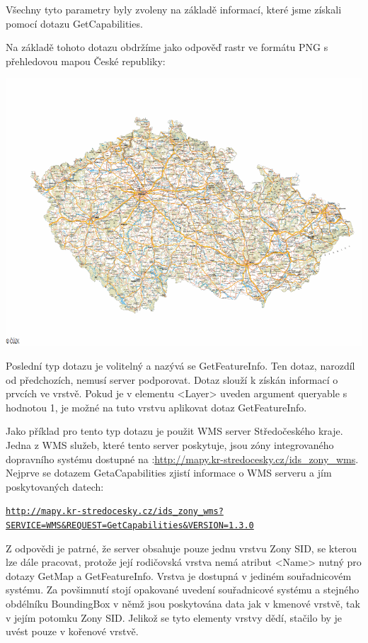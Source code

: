 \documentclass[a4paper,12pt]{article}
\begin{document}
Všechny tyto parametry byly zvoleny na základě informací, které jsme získali pomocí dotazu GetCapabilities. 

Na základě tohoto dotazu obdržíme jako odpověď rastr ve formátu PNG s přehledovou mapou České republiky:

 \includegraphics[scale=0.5]{figures/GetMapResponse}


Poslední typ dotazu je volitelný a nazývá se GetFeatureInfo. Ten dotaz, narozdíl od předchozích, nemusí server podporovat.
Dotaz slouží k získán informací o prvcích ve vrstvě. Pokud je v elementu <Layer> uveden argument  queryable 
s hodnotou 1, je možné na tuto vrstvu aplikovat dotaz GetFeatureInfo.  

Jako příklad pro tento typ dotazu je použit WMS server Středočeského kraje. Jedna z WMS služeb, které tento server poskytuje, jsou zóny integrovaného dopravního systému dostupné
na :\url{http://mapy.kr-stredocesky.cz/ids_zony_wms}. 
Nejprve se dotazem GetaCapabilities zjistí informace o WMS serveru a jím poskytovaných datech:

\newcommand{\StredoceskygetCap}{http://mapy.kr-stredocesky.cz/ids_zony_wms?SERVICE=WMS&REQUEST=GetCapabilities}
\begin{alltt}\footnotesize
\href{\StredoceskygetCap}{http://mapy.kr-stredocesky.cz/ids\_zony\_wms?}
\href{\StredoceskygetCap}{SERVICE=WMS\&REQUEST=GetCapabilities\&VERSION=1.3.0}
\end{alltt}

Z odpovědi je patrné, že server obsahuje pouze jednu vrstvu Zony SID, se kterou lze dále pracovat, protože její rodičovská vrstva nemá atribut <Name> nutný pro dotazy GetMap a GetFeatureInfo.
Vrstva je dostupná v jediném souřadnicovém systému. Za povšimnutí stojí opakované uvedení souřadnicové systému a stejného obdélníku BoundingBox v němž jsou poskytována data 
jak v kmenové vrstvě, tak v jejím potomku Zony SID. Jelikož se tyto elementy vrstvy dědí, stačilo by je uvést pouze v kořenové vrstvě.
\end{document}
